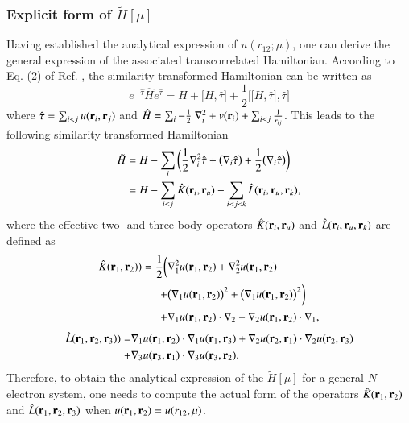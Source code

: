 \documentclass[aip,jcp,reprint,noshowkeys,superscriptaddress]{revtex4-1}
\newcommand{\br}[0]{{\bf {r}}}
\newcommand{\bri}[1]{{\bf r}_{#1}}
\begin{document}
\subsubsection{Explicit form of $\tilde{H}[\mu]$ }
Having established the analytical expression of $u(r_{12};\mu)$, one can derive the general expression of the associated transcorrelated Hamiltonian.  
According to Eq. (2) of Ref. , the similarity transformed Hamiltonian can be written as 
\begin{equation}
 \label{ht_def_g}
 e^{-\hat{\tau}} \hat{H} e^{\hat{\tau}} = H + \big[ H,\hat{\tau} \big] + \frac{1}{2}\bigg[ \big[H,\hat{\tau}\big],\hat{\tau}\bigg]
\end{equation}
where $\hat{\tau} = \sum_{i<j}u(\br{}_i,\br{}_j)$ and $\hat{H} = \sum_i -\frac{1}{2} \nabla^2_i + v(\br{}_i) + \sum_{i<j} \frac{1}{r_{ij}}$. 
This leads to the following similarity transformed Hamiltonian 
\begin{equation}
 \begin{aligned}
 \label{ht_def_gu}
 \tilde{H} & = H - \sum_i \bigg( \frac{1}{2} \nabla_i^2 \hat{\tau} + \big(\nabla_i \hat{\tau} \big) + \frac{1}{2} \big(\nabla_i \hat{\tau} \big)  \bigg) \\
           & = H - \sum_{i<j} \hat{K}(\bri{i},\bri{u}) - \sum_{i<j<k} \hat{L}(\bri{i},\bri{u},\bri{k}),
 \end{aligned}
\end{equation}
where the effective two- and three-body operators $\hat{K}(\bri{i},\bri{u})$ and $\hat{L}(\bri{i},\bri{u},\bri{k})$ are defined as
\begin{equation}
 \begin{aligned}
 \label{def_k}
  \hat{K}(\bri{1},\bri{2}) ) = \frac{1}{2} \bigg( &\nabla_1^2 u(\bri{1},\bri{2}) + \nabla_2^2u(\bri{1},\bri{2}) \\
                                               + &\big(\nabla_1 u(\bri{1},\bri{2}) \big) ^2 + \big(\nabla_1 u(\bri{1},\bri{2}) \big) ^2 \bigg) \\
                                               + &\nabla_1 u(\bri{1},\bri{2}) \cdot \nabla_2 + \nabla_2 u(\bri{1},\bri{2}) \cdot \nabla_1,
 \end{aligned}
\end{equation}
\begin{equation}
 \begin{aligned}
 \label{def_k}
  \hat{L}(\bri{1},\bri{2},\bri{3}) ) = & \nabla_1 u(\bri{1},\bri{2}) \cdot \nabla_1 u(\bri{1},\bri{3}) + \nabla_2 u(\bri{2},\bri{1}) \cdot \nabla_2 u(\bri{2},\bri{3})  \\
                                     + & \nabla_3 u(\bri{3},\bri{1}) \cdot \nabla_3 u(\bri{3},\bri{2}).
 \end{aligned}
\end{equation}
Therefore, to obtain the analytical expression of the $\tilde{H}[\mu]$ for a general $N$-electron system, 
one needs to compute the actual form of the operators $\hat{K}(\bri{1},\bri{2})$ and $\hat{L}(\bri{1},\bri{2},\bri{3})$ when $u(\bri{1},\bri{2}) = u(r_{12},\mu)$. 
\end{document}
